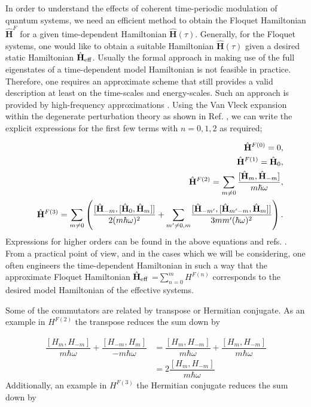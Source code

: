 \documentclass[aps,prb,showpacs,amsmath,amssymb,superscriptaddress]{revtex4-2}
\let\oldhat\hat
\renewcommand{\hat}[1]{\oldhat{\mathbf{#1}}}
\begin{document}
In order to understand the effects of coherent time-periodic modulation of quantum systems, we need an efficient method to obtain the Floquet
Hamiltonian $\hat{H}^{F}$ for a given time-dependent Hamiltonian $\hat{H} (\tau )$. Generally, for the Floquet systems, one would like to obtain a
suitable Hamiltonian $\hat{H}(\tau )$ given a desired static Hamiltonian $\hat{H}_{\rm eff}$. Usually the formal approach in making use of the
full eigenstates of a time-dependent model Hamiltonian is not feasible in practice. Therefore, one requires an approximate scheme that still provides
a valid description at least on the time-scales and energy-scales. Such an approach is provided by high-frequency approximations \cite{JHS,HSA,MGP,MBL,AEE,NGJ}.
Using the Van Vleck expansion within the degenerate perturbation theory as shown in Ref. \cite{AEE}, we can write the explicit expressions for the first few terms with $n=0,1,2$ as required;

\begin{eqnarray} \label{eq:44}
&&\hat{H}^{F(0)}=0,  \\
&&\hat{H}^{F(1)}=\hat{H}_{0},  \\
&&\hat{H}^{F(2)} =\sum_{m\neq 0}\frac{[\hat{H}_{m},\hat{H}_{-m}]}{m\hbar \omega }
\notag,\\
&&\hat{H}^{F(3)}={\displaystyle\sum_{m\neq0}}
\left(  \frac{[\hat{H}_{-m},[\hat{H}_{0},\hat{H}_{m}]]}{2(m\hbar\omega)^{2}
}+{\displaystyle\sum_{m^{\prime}\neq0,m}}
\frac{[\hat{H}_{-m^{\prime}},[\hat{H}_{m^{\prime}-m},\hat{H}_{m}
]]}{3mm^{\prime}(\hbar\omega)^{2}}\right)\notag.
\end{eqnarray}
Expressions for higher orders can be found in the above equations and refs. \cite{JHS,HSA,MGP,MBL,AEE,NGJ}. From a practical
point of view, and in the cases which we will be considering, one often engineers the time-dependent Hamiltonian in such a way that the approximate
Floquet Hamiltonian $\hat{H}_{\rm eff}$ =$\sum_{n=0}^{m}H^{F(n)}$ corresponds to the desired model Hamiltonian of the effective systems.

Some of the commutators are related by transpose or Hermitian conjugate.
As an example in $H^{F(2)}$ the transpose reduces the sum down by

\begin{align}
  \dfrac{[H_m,H_{-m}]}{m\hbar \omega} + \dfrac{[H_{-m}, H_m]}{-m\hbar\omega} &= \dfrac{[H_m,H_{-m}]}{m\hbar \omega} + \dfrac{[H_m, H_{-m}]}{m\hbar\omega} \\
  &= 2\dfrac{[H_m,H_{-m}]}{m\hbar \omega}
\end{align}
Additionally, an example in $H^{F(3)}$ the Hermitian conjugate reduces the sum down by
\end{document}
